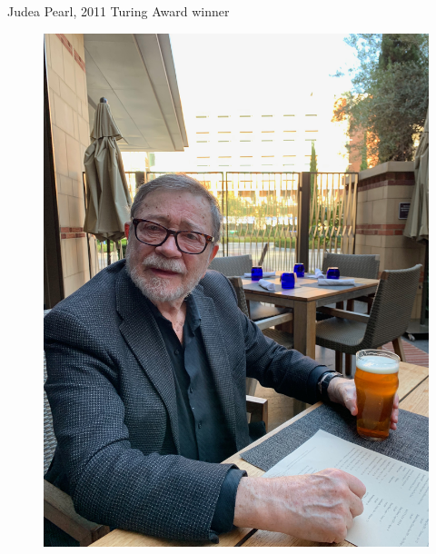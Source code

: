 \documentclass{beamer}
\begin{document}
\begin{frame}{Judea Pearl, 2011 Turing Award winner}

  \begin{figure}
    \includegraphics[scale=0.05]{./lecture_includes/pearl_ipa.jpg}
  \end{figure}

\end{frame}
\end{document}
